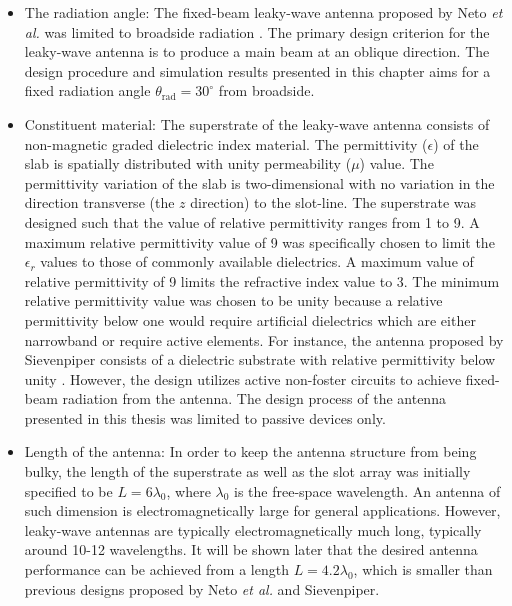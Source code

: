 \begin{itemize}
    \item The radiation angle: The fixed-beam leaky-wave antenna proposed by Neto \textit{et al.} was limited to broadside radiation \cite{Neto2005}\cite{Bruni2007}. The primary design criterion for the leaky-wave antenna is to produce a main beam at an oblique direction. The design procedure and simulation results presented in this chapter aims for a fixed radiation angle $\theta_{\mathrm{rad}} = 30^\circ$ from broadside. %
    
    \item Constituent material: The superstrate of the leaky-wave antenna consists of non-magnetic graded dielectric index material. The permittivity ($\epsilon$) of the slab is spatially distributed with unity permeability ($\mu$) value. The permittivity variation of the slab is two-dimensional with no variation in the direction transverse (the $z$ direction) to the slot-line. The superstrate was designed such that the value of relative permittivity ranges from 1 to 9. A maximum relative permittivity value of 9 was specifically chosen to limit the $\epsilon_r$ values to those of commonly available dielectrics. A maximum value of relative permittivity of 9 limits the refractive index value to 3. The minimum relative permittivity value was chosen to be unity because a relative permittivity below one would require artificial dielectrics which are either narrowband or require active elements. For instance, the antenna proposed by Sievenpiper consists of a dielectric substrate with relative permittivity below unity \cite{Sievenpiper2011}. However, the design utilizes active non-foster circuits to achieve fixed-beam radiation from the antenna. The design process of the antenna presented in this thesis was limited to passive devices only.
    
    \item Length of the antenna: In order to keep the antenna structure from being bulky, the length of the superstrate as well as the slot array was initially specified to be $L = 6 \lambda_0$, where $\lambda_0$ is the free-space wavelength. An antenna of such dimension is electromagnetically large for general applications. However, leaky-wave antennas are typically electromagnetically much long, typically around 10-12 wavelengths. It will be shown later that the desired antenna performance can be achieved from a length $L = 4.2 \lambda_0$, which is smaller than previous designs proposed by Neto \textit{et al.} and Sievenpiper.
    

\end{itemize}
